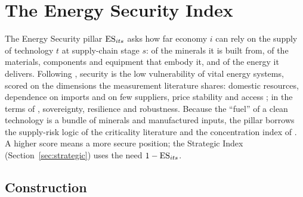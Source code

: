 \section{The Energy Security Index}\label{sec:es}\label{sec:energy_security}

The Energy Security pillar $\mathrm{ES}_{its}$ asks how far economy $i$ can rely on the supply of
technology $t$ at supply-chain stage $s$: of the minerals it is built from, of the materials,
components and equipment that embody it, and of the energy it delivers. Following
\citet{cherp2014concept}, security is the low vulnerability of vital energy systems, scored on the
dimensions the measurement literature shares: domestic resources, dependence on imports and on few
suppliers, price stability and access
\citep{kruyt2009indicators,sovacool2011conceptualizing,winzer2012conceptualizing,ang2015energy}; in
the terms of \citet{cherp2011three}, sovereignty, resilience and robustness. Because the ``fuel'' of
a clean technology is a bundle of minerals and manufactured inputs, the pillar borrows the
supply-risk logic of the criticality literature
\citep{graedel2012methodology,nassar2020evaluating,kowalski2023raw,iea2025gcmo} and the
concentration index of \citet{hirschman1945national}. A higher score means a more secure position;
the Strategic Index (Section~\ref{sec:strategic}) uses the need $1-\mathrm{ES}_{its}$.

\subsection{Construction}\label{subsec:es_aggregation}

